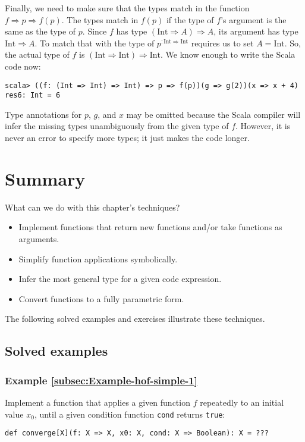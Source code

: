 Finally, we need to make sure that the types match in the function
$f\Rightarrow p\Rightarrow f(p)$. The types match in $f(p)$ if the
type of $f$'s argument is the same as the type of $p$. Since $f$
has type $\left(\text{Int}\Rightarrow A\right)\Rightarrow A$, its
argument has type $\text{Int}\Rightarrow A$. To match that with the
type of $p^{:\text{Int}\Rightarrow\text{Int}}$ requires us to set
$A=\text{Int}$. So, the actual type of $f$ is $\left(\text{Int}\Rightarrow\text{Int}\right)\Rightarrow\text{Int}$.
We know enough to write the Scala code now:
\begin{lstlisting}
scala> ((f: (Int => Int) => Int) => p => f(p))(g => g(2))(x => x + 4)
res6: Int = 6
\end{lstlisting}
Type annotations for $p$, $g$, and $x$ may be omitted because the
Scala compiler will infer the missing types unambiguously from the
given type of $f$. However, it is never an error to specify more
types; it just makes the code longer.

\section{Summary}

What can we do with this chapter's techniques?
\begin{itemize}
\item Implement functions that return new functions and/or take functions
as arguments.
\item Simplify function applications symbolically.
\item Infer the most general type for a given code expression.
\item Convert functions to a fully parametric form.
\end{itemize}
The following solved examples and exercises illustrate these techniques.

\subsection{Solved examples}

\subsubsection{Example \label{subsec:Example-hof-simple-1}\ref{subsec:Example-hof-simple-1}}

Implement a function that applies a given function $f$ repeatedly
to an initial value $x_{0}$, until a given condition function \lstinline!cond!
returns \lstinline!true!:
\begin{lstlisting}
def converge[X](f: X => X, x0: X, cond: X => Boolean): X = ???
\end{lstlisting}


